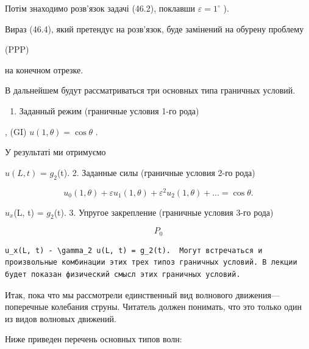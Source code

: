 \documentclass[
  ukrainian,
]{article}
\providecommand{\tightlist}{%
  \setlength{\itemsep}{0pt}\setlength{\parskip}{0pt}}
\begin{document}
Потім знаходимо розв'язок задачі (46.2), поклавши
\(\varepsilon = 1^{\circ}\) ).

Вираз (46.4), який претендує на розв'язок, буде замінений на обурену
проблему

(PPP)

на конечном отрезке.

В дальнейшем будут рассматриваться три основных типа граничных условий.

\begin{enumerate}
\def\labelenumi{\arabic{enumi}.}
\tightlist
\item
  Заданный режим (граничные условия 1-го рода)
\end{enumerate}

, (GI) \(u(1, \theta) = \cos \theta\) .

У результаті ми отримуємо

\(u(L, t)\) = \(g_2\)(t). 2. Заданные силы (граничные условия 2-го рода)

\[
u_0 (1, \theta) + \varepsilon u_1 (1, \theta) + \varepsilon^2 u_2 (1, \theta) + \ldots = \cos \theta.
\]

\(u_x\)(L, t) = \(g_2\)(t). 3. Упругое закрепление (граничные условия
3-го рода)

\[
P_{0}
\]

\begin{verbatim}
u_x(L, t) - \gamma_2 u(L, t) = g_2(t).  Могут встречаться и произвольные комбинации этих трех типоз граничных условий. В лекции будет показан физический смысл этих граничных условий.
\end{verbatim}

Итак, пока что мы рассмотрели единственный вид волнового
движения---поперечные колебания струны. Читатель должен понимать, что
это только один из видов волновых движений.

Ниже приведен перечень основных типов волн:
\end{document}
